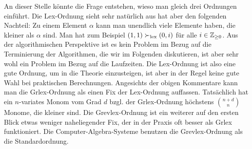 \documentclass[11pt]{article}
\numberwithin{equation}{section}
\begin{document}
An dieser Stelle könnte die Frage entstehen, wieso man gleich drei Ordnungen einführt. Die Lex-Ordnung sieht sehr natürlich aus hat aber den folgenden Nachteil: Zu einem Element $\alpha$ kann man unendlich viele Elemente haben, die kleiner  als $\alpha$ sind. Man hat zum Beispiel $(1,1) \succ_{\operatorname{lex}}  (0,i)$ für alle $i \in \mathbb{Z}_{\ge 0}$. Aus der algorithmischen Perspektive ist es kein Problem im Bezug auf die Terminierung der Algorithmen, die wir im Folgenden diskutieren, ist aber sehr wohl ein Problem im Bezug auf die Laufzeiten. Die Lex-Ordnung ist also eine gute Ordnung, um in die Theorie einzusteigen, ist aber in der Regel keine gute Wahl bei praktischen  Berechnungen. Angesichts der obigen Kommentare kann man die Grlex-Ordnung als einen Fix der Lex-Ordnung auffassen. Tatsächlich hat ein $n$-variates Monom vom Grad $d$ bzgl. der Grlex-Ordnung höchstens $\binom{n+d}{n}$ Monome, die kleiner sind. Die Grevlex-Ordnung ist ein weiterer auf den ersten Blick etwas weniger naheliegender Fix, der in der Praxis oft besser als Grlex funktioniert. Die Computer-Algebra-Systeme benutzen die Grevlex-Ordnung als die Standardordnung. 

\end{document}
